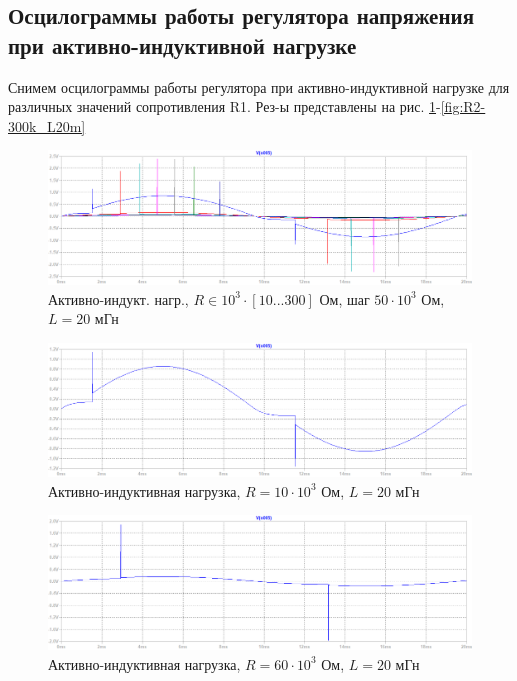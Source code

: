 \documentclass[a4paper, 12pt]{article}
\begin{document}
    \subsection{Осцилограммы работы регулятора напряжения при активно-индуктивной нагрузке}
    Снимем осцилограммы работы регулятора при активно-индуктивной нагрузке
    для различных значений сопротивления R1. Рез-ы представлены на рис. \ref{fig:R2-all_L20m}-\ref{fig:R2-300k_L20m}
    \begin{figure}[H]
        \centering
        \includegraphics[scale=0.45]{R2-all_L20m.png}
        \captionsetup{skip=0pt}
        \caption{Активно-индукт. нагр., $R\in10^3\cdot\left[ 10...300 \right]$ Ом, шаг $50\cdot10^3$ Ом, $L=20$ мГн}
        \label{fig:R2-all_L20m}
    \end{figure}
    \begin{figure}[H]
        \centering
        \includegraphics[scale=0.45]{R2-10k_L20m.png}
        \captionsetup{skip=0pt}
        \caption{Активно-индуктивная нагрузка, $R=10\cdot10^3$ Ом, $L=20$ мГн}
        \label{fig:R2-10k_L20m}
    \end{figure}
    \begin{figure}[H]
        \centering
        \includegraphics[scale=0.45]{R2-60k_L20m.png}
        \captionsetup{skip=0pt}
        \caption{Активно-индуктивная нагрузка, $R=60\cdot10^3$ Ом, $L=20$ мГн}
        \label{fig:R2-60k_L20m}
    \end{figure}
\end{document}
